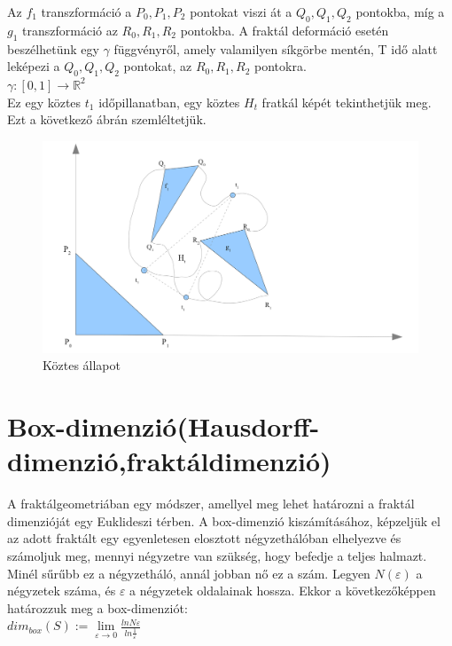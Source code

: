 Az $f_1{}$ transzformáció a $P_{0}, P_{1}, P_{2}$ pontokat viszi át a $Q_{0}, Q_{1}, Q_{2}$ pontokba, míg a $g_{1}$ transzformáció az $R_{0}, R_{1}, R_{2}$ pontokba. A fraktál deformáció esetén beszélhetünk egy $\gamma$ függvényről, amely valamilyen síkgörbe mentén, T idő alatt leképezi a $Q_{0}, Q_{1}, Q_{2}$ pontokat, az $R_{0}, R_{1}, R_{2}$ pontokra.\\

$\gamma: [0,1] \rightarrow \mathbb{R}^2$\\

Ez egy köztes $t_{1}$ időpillanatban, egy köztes $H_{t}$ fratkál képét tekinthetjük meg. Ezt a következő ábrán szemléltetjük.

\begin{figure}[H]
	\centering	
	\includegraphics[scale=0.3]{Images/Figture4}
	\caption{Köztes állapot}	
\end{figure}	

\section{Box-dimenzió(Hausdorff-dimenzió,fraktáldimenzió)}

A fraktálgeometriában egy módszer, amellyel meg lehet határozni a fraktál dimenzióját egy Euklideszi
térben. A box-dimenzió kiszámításához, képzeljük el az adott fraktált egy egyenletesen elosztott
négyzethálóban elhelyezve és számoljuk meg, mennyi négyzetre van szükség, hogy befedje a teljes
halmazt. Minél sűrűbb ez a négyzetháló, annál jobban nő ez a szám.
Legyen $N(\varepsilon)$ a négyzetek száma, és $\varepsilon$ a négyzetek oldalainak hossza. Ekkor a következőképpen határozzuk meg a box-dimenziót:\\

$dim_{box}(S):=\lim\limits_{\varepsilon \rightarrow 0} \frac{lnN\varepsilon}{ln \frac{1}{\varepsilon}}$\\

